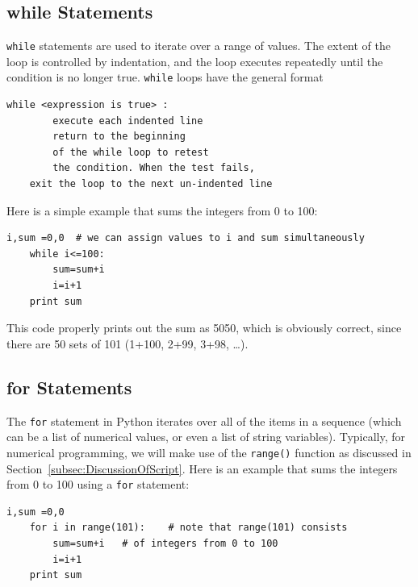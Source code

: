 \subsection{while Statements}
\label{subsec-while}
\verb!while! statements are used to iterate over a range of values. The extent of the loop is controlled by indentation, and the loop executes repeatedly until the condition is no longer true. \verb!while! loops have the general format
\begin{lstlisting}[frame=none]
	while <expression is true> :
		execute each indented line
		return to the beginning
		of the while loop to retest 
		the condition. When the test fails,
	exit the loop to the next un-indented line
\end{lstlisting}
Here is a simple example that sums the integers from 0 to 100:
\begin{lstlisting}[frame=none]
	i,sum =0,0	# we can assign values to i and sum simultaneously
	while i<=100:
		sum=sum+i
		i=i+1		
	print sum
\end{lstlisting}
This code properly prints out the sum as 5050, which is obviously correct, since there are 50 sets of 101 (1+100, 2+99, 3+98, \ldots). 

\subsection{for Statements}
\label{subsec-for}
The \verb!for! statement in Python iterates over all of the items in a sequence (which can be a list of numerical values, or even a list of string variables). Typically, for numerical programming, we will make use of the \verb!range()! function as discussed in Section~\ref{subsec:DiscussionOfScript}. Here is an example that sums the integers from 0 to 100 using a \verb!for! statement:
\begin{lstlisting}[frame=none]
	i,sum =0,0	
	for i in range(101):	# note that range(101) consists
		sum=sum+i	# of integers from 0 to 100
		i=i+1		
	print sum
\end{lstlisting}



